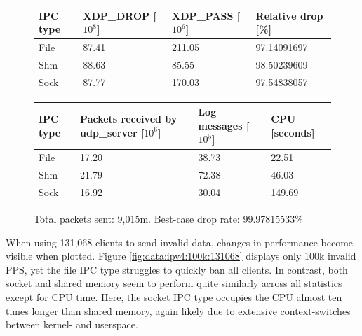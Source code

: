 \begin{figure}[!h]
	\centering
	\scriptsize
	\begin{tabular}{llll}
		\toprule
		\textbf{IPC type} & \textbf{XDP\_DROP [$10^8$]} & \textbf{XDP\_PASS [$10^6$]} & \textbf{Relative drop [\%]} \\ \midrule 
		File & 87.41 & 211.05 & 97.14091697 \\
        Shm & 88.63 & 85.55 & 98.50239609 \\
        Sock & 87.77 & 170.03 & 97.54838057 \\
	\bottomrule
	\end{tabular}
    \begin{tabular}{llll}
		\toprule
		\textbf{IPC type} & \textbf{Packets received by udp\_server [$10^6$]} & \textbf{Log messages [$10^5$]} & \textbf{CPU [seconds]} \\ \midrule 
		File & 17.20 & 38.73 & 22.51 \\
        Shm & 21.79 & 72.38 & 46.03 \\
        Sock & 16.92 & 30.04 & 149.69 \\
	\bottomrule
	\end{tabular}
	\caption[Simplefail2ban, IPv6, 30m \ac{PPS}, 65,534 malicious clients]{Total packets sent: 9,015m. Best-case drop rate: 99.97815533\%}
	\label{fig:data:ipv6:30m:65534}
\end{figure}

When using 131,068 clients to send invalid data, changes in performance become visible when plotted.
Figure \ref{fig:data:ipv4:100k:131068} displays only 100k invalid \ac{PPS}, yet the file \ac{IPC} type struggles to quickly ban all clients.
In contrast, both socket and shared memory seem to perform quite similarly across all statistics except for \ac{CPU} time.
Here, the socket \ac{IPC} type occupies the \ac{CPU} almost ten times longer than shared memory, again likely due to extensive context-switches between kernel- and userspace.

